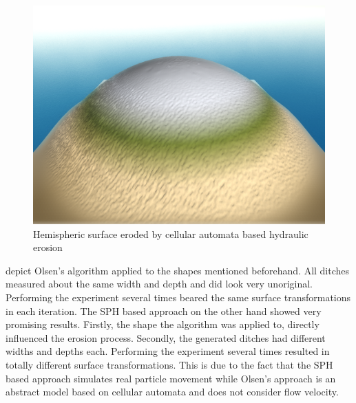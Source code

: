 \documentclass[11pt,a4paper,twoside,openright]{report}
\begin{document}
\begin{figure}[!htb]
  \includegraphics[width=\linewidth]{hydro-10mins-46k-iterations-hemisphere.png}
  \caption{Hemispheric surface eroded by cellular automata based hydraulic erosion}\label{fig:hydro3}
\endminipage
\end{figure}
 depict Olsen's algorithm applied to the shapes mentioned beforehand. All ditches measured about the same width and depth and did look very unoriginal. Performing the experiment several times beared the same surface transformations in each iteration. The SPH based approach on the other hand showed very promising results. Firstly, the shape the algorithm was applied to, directly influenced the erosion process. Secondly, the generated ditches had different widths and depths each. Performing the experiment several times resulted in totally different surface transformations. This is due to the fact that the SPH based approach simulates real particle movement while Olsen's approach is an abstract model based on cellular automata and does not consider flow velocity.
\end{document}
